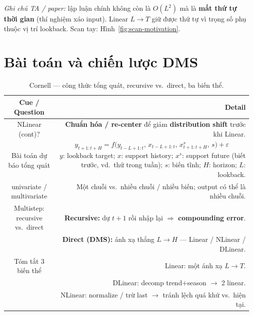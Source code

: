\documentclass[12pt,a4paper]{article}
\newcommand{\cornellhead}{%
  \toprule
  \textbf{Cue / Question} & \textbf{Detail} \\
  \midrule
}
\begin{document}
\noindent\textit{Ghi chú TA / paper:} lập luận chính không còn là \(O(L^2)\) mà là
\textbf{mất thứ tự thời gian} (thí nghiệm xáo input).
Linear \(L\to T\) giữ được thứ tự vì trọng số phụ thuộc vị trí lookback.
Scan tay: Hình~\ref{fig:scan-motivation}.

\section{Bài toán và chiến lược DMS}

\begin{table}[H]
  \centering
  \caption{Cornell --- công thức tổng quát, recursive vs.\ direct, ba biến thể.}
  \label{tab:cornell-dms}
  \small
  \begin{tabularx}{\textwidth}{@{}CD@{}}
    \cornellhead
    NLinear (cont)?                  &
    \textbf{Chuẩn hóa / re-center} để giảm \textbf{distribution shift} trước khi Linear.                              \\
    \addlinespace
    Bài toán dự báo tổng quát        &
    \[
      \hat{y}_{t+1:t+H}
      = f\!\bigl(y_{t-L+1:t},\, x_{t-L+1:t},\, x_{t+1:t+H}^{s},\, s\bigr)+\varepsilon
    \]
    \(y\): lookback target; \(x\): support history;
    \(x^{s}\): support future (biết trước, vd.\ thứ trong tuần);
    \(s\): biến tĩnh; \(H\): horizon; \(L\): lookback.                                                                \\
    \addlinespace
    univariate / multivariate        &
    Một chuỗi vs.\ nhiều chuỗi / nhiều biến; output có thể là nhiều chuỗi.                                            \\
    \addlinespace
    Multistep: recursive vs.\ direct &
    \textbf{Recursive:} dự \(t{+}1\) rồi nhập lại $\Rightarrow$ \textbf{compounding error}.                           \\
                                     & \textbf{Direct (DMS):} ánh xạ thẳng \(L\to H\) --- Linear / NLinear / DLinear. \\
    \addlinespace
    Tóm tắt 3 biến thể               &
    Linear: một ánh xạ \(L\to T\).                                                                                    \\
                                     & DLinear: decomp trend+season $\to$ 2 linear.                                   \\
                                     & NLinear: normalize / trừ last $\to$ tránh lệch quá khứ vs.\ hiện tại.          \\
    \bottomrule
  \end{tabularx}
\end{table}
\end{document}
